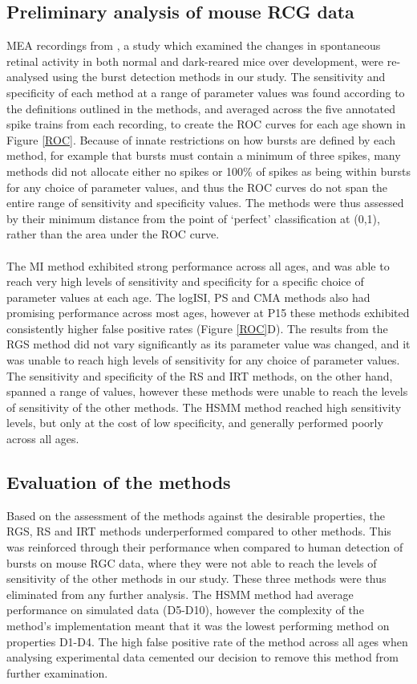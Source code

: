 \documentclass[12pt, titlepage]{article}
\begin{document}
\subsection*{Preliminary analysis of mouse RCG data}
 MEA recordings from \cite{Demas2003}, a study which examined the changes in spontaneous retinal activity in both normal and dark-reared mice over development, were re-analysed using the burst detection methods in our study. The sensitivity and specificity of each method at a range of parameter values was found according to the definitions outlined in the methods, and averaged across the five annotated spike trains from each recording, to create the ROC curves for each age shown in Figure \ref{ROC}. 
Because of innate restrictions on how bursts are defined by each method, for example that bursts must contain a minimum of three spikes, many methods did not allocate either no spikes or 100\% of spikes as being within bursts for any choice of parameter values, and thus the ROC curves do not span the entire range of sensitivity and specificity values. The methods were thus assessed by their minimum distance from the point of ‘perfect’ classification at (0,1), rather than the area under the ROC curve.
\\ \\The MI method exhibited strong performance across all ages, and was able to reach very high levels of sensitivity and specificity for a specific choice of parameter values at each age. The logISI, PS and CMA methods also had promising performance across most ages, however at P15 these methods exhibited consistently higher false positive rates (Figure \ref{ROC}D). The results from the RGS method did not vary significantly as its parameter value was changed, and it was unable to reach high levels of sensitivity for any choice of parameter values. The sensitivity and specificity of the RS and IRT methods, on the other hand, spanned a range of values, however these methods were unable to reach the levels of sensitivity of the other methods. The HSMM method reached high sensitivity levels, but only at the cost of low specificity, and generally performed poorly across all ages.
\subsection*{Evaluation of the methods} 
Based on the assessment of the methods against the desirable properties, the RGS, RS and IRT methods underperformed compared to other methods. This was reinforced through their performance when compared to human detection of bursts on mouse RGC data, where they were not able to reach the levels of sensitivity of the other methods in our study. These three methods were thus eliminated from any further analysis. The HSMM method had average performance on simulated data (D5-D10), however the complexity of the method's implementation meant that it was the lowest performing method on properties D1-D4. The high false positive rate of the method across all ages when analysing experimental data cemented our decision to remove this method from further examination. 
\end{document}
